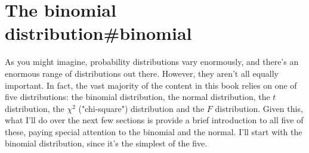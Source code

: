 \begin{comment}
There's only one way to satisfy these constraints: set the impossible events to have zero probability (i.e., $P(x | A) = 0$ if $x$ is not in $A$), and then divide the probabilities of all the others by $P(A)$. In this case, since $P(A) = 0.9$, we divide by 0.9. This gives: 
\begin{center}
\begin{tabular}{llcc}
which pants? & elementary event & old prob, $P(x)$ & new prob, $P(x | A)$ \\ \hline
blue jeans &  $x_1$ &  0.5  & 0.556 \\
grey jeans &  $x_2$ & 0.3  & 0.333 \\
black jeans & $x_3$ & 0.1  &  0.111 \\
black suit & $x_4$ & 0     &  0  \\
blue tracksuit & $x_5$ & 0.1  & 0 \\
\end{tabular}
\end{center}
In mathematical terms, we say that 
$$
P(x | A) = \frac{P(x)}{P(A)}
$$ 
if $x \in A$, and $P(x|A) = 0$ otherwise. And therefore...
$$
\begin{array}{rcl}
P(B | A) &=& P(x_3 | A)  + P(x_4 | A) \\ \\
&=&  \displaystyle\frac{P(x_3)}{P(A)} + 0    \\ \\
&=& \displaystyle\frac{P(x_3)}{P(A)}
\end{array}
$$
Now, recalling that $A \cap B = (x_3)$, we can write this as
$$
P(B | A) = \frac{P(A \cap B)}{P(A)}
$$
and if we multiply both sides by $P(A)$ we obtain:
$$
P(A \cap B) = P(B| A) P(A)
$$ 
which is the third rule that we had listed in Table@reftab:probrules.


\end{comment}





\section{The binomial distribution{#binomial}}

As you might imagine, probability distributions vary enormously, and there's an enormous range of distributions out there. However, they aren't all equally important. In fact, the vast majority of the content in this book relies on one of five distributions: the binomial distribution, the normal distribution, the $t$ distribution, the $\chi^2$ ("chi-square") distribution and the $F$ distribution. Given this, what I'll do over the next few sections is provide a brief introduction to all five of these, paying special attention to the binomial and the normal. I'll start with the binomial distribution, since it's the simplest of the five.


